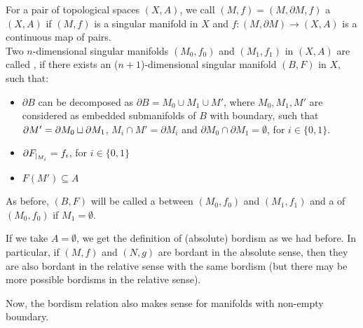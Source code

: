 \documentclass[a4paper,11pt]{article}
\begin{document}
\begin{definition}
    For a pair of topological spaces \((X,A)\), we call \((M,f)=(M,\partial M,f)\) a \((X,A)\) if \((M,f)\) is a singular manifold in \(X\) and \(f:(M,\partial M)\to (X,A)\) is a continuous map of pairs.\\
    Two \(n\)-dimensional singular manifolds \((M_0,f_0)\) and \((M_1,f_1)\) in \((X,A)\) are called , if there exists an (\(n+1\))-dimensional singular manifold \((B,F)\) in \(X\), such that:
    \begin{itemize}
        \item \(\partial B\) can be decomposed as  \(\partial B=M_0\cup M_1\cup M'\), where \(M_0,M_1,M'\) are considered as embedded submanifolds of \(B\) with boundary, such that 
        \(\partial M'=\partial M_0\sqcup \partial M_1\), 
        \(M_i\cap M'=\partial M_i\) and \(\partial M_0
        \cap\partial M_1=\emptyset\), for \(i\in\{0,1\}\).

        \item \(\partial F_{|_{M_i}}=f_i\), for \(i\in\{0,1\}\)

        \item \(F(M')\subseteq A\)
    \end{itemize}
    As before, \((B,F)\) will be called a  between \((M_0,f_0)\) and \((M_1,f_1)\) and a  of \((M_0,f_0)\) if \(M_1=\emptyset\).
\end{definition}

\begin{remark}
    If we take \(A=\emptyset\), we get the definition of (absolute) bordism as we had before. In particular, if \((M,f)\) and \((N,g)\) are bordant in the absolute sense, then they are also bordant in the relative sense with the same bordism (but there may be more possible bordisms in the relative sense).
\end{remark}


    Now, the bordism relation also makes sense for manifolds with non-empty boundary.
\end{document}

